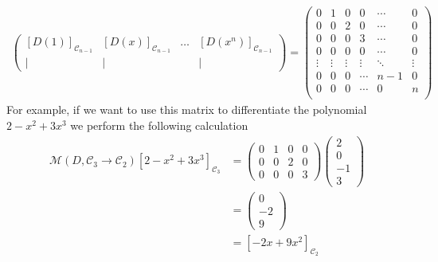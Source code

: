 {\begin{align*}
\begin{pmatrix}
[D(1)]_{\mathcal{C}_{n-1}} & [D(x)]_{\mathcal{C}_{n-1}} & \dots & [D(x^n)]_{\mathcal{C}_{n-1}} \\
| & | &  & | 
\end{pmatrix}
=
\begin{pmatrix}
  0    &   1    &   0    &   0    & \cdots &   0 \\
  0    &   0    &   2    &   0    & \cdots &   0 \\
  0    &   0    &   0    &   3    & \cdots &   0 \\
  0    &   0    &   0    &   0    & \cdots &   0 \\
\vdots & \vdots & \vdots & \vdots & \ddots & \vdots \\
  0    &   0    &   0    & \cdots &   n-1  &   0 \\
  0    &   0    &   0    & \cdots &   0    &   n \\
\end{pmatrix}
\end{align*}
For example, if we want to use this matrix to differentiate the polynomial $2 - x^2 + 3x^3$ we perform the following calculation
\begin{align*}
\mathcal{M}(D,\mathcal{C}_3\to\mathcal{C}_{2}) [2 - x^2 + 3x^3]_{\mathcal{C}_3}
&=
\begin{pmatrix}
  0  &  1  &  0  &  0\\
  0  &  0  &  2  &  0\\
  0  &  0  &  0  &  3  
\end{pmatrix}
\begin{pmatrix}
2 \\ 0 \\ -1 \\ 3
\end{pmatrix} \\
&=
\begin{pmatrix}
0 \\ -2 \\ 9 
\end{pmatrix} \\
&=
[-2x + 9x^2]_{\mathcal{C}_2}
\end{align*}
}

